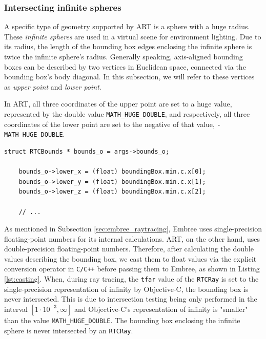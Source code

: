 \subsubsection{Intersecting infinite spheres}

A specific type of geometry supported by ART is a sphere with a huge radius. These \emph{infinite spheres} are used in a virtual scene for environment lighting.
Due to its radius, the length of the bounding box edges enclosing the infinite sphere is twice the infinite sphere's radius. 
Generally speaking, axis-aligned bounding boxes can be described by two vertices in Euclidean space, connected via the bounding box's body diagonal. In this subsection, we will refer to these vertices as \emph{upper point} and \emph{lower point}. 

In ART, all three coordinates of the upper point are set to a huge value, represented by the double value \texttt{MATH\_HUGE\_DOUBLE}, and respectively, all three coordinates of the lower point are set to the negative of that value, \texttt{- MATH\_HUGE\_DOUBLE}.

\begin{listing} 
	\begin{lstlisting}[caption={Casting of a double precision floating point number to a single precision floating point number by explicit conversion.}, label={lst:casting}]
	struct RTCBounds * bounds_o = args->bounds_o;
	
	bounds_o->lower_x = (float) boundingBox.min.c.x[0];
	bounds_o->lower_y = (float) boundingBox.min.c.x[1];
	bounds_o->lower_z = (float) boundingBox.min.c.x[2];
	
	// ...
	\end{lstlisting}
\end{listing}

As mentioned in Subsection \ref{sec:embree_raytracing}, Embree uses single-precision floating-point numbers for its internal calculations. ART, on the other hand, uses double-precision floating-point numbers. Therefore, after calculating the double values describing the bounding box, we cast them to float values via the explicit conversion operator in \texttt{C/C++} before passing them to Embree, as shown in Listing \ref{lst:casting}.  
When, during ray tracing, the \texttt{tfar} value of the \texttt{RTCRay} is set to the single-precision representation of infinity by Objective-C, the bounding box is never intersected. This is due to intersection testing being only performed in the interval $[1\cdot 10^{-3},\infty]$ and Objective-C's representation of infinity is "smaller" than the value \texttt{MATH\_HUGE\_DOUBLE}. The bounding box enclosing the infinite sphere is never intersected by an \texttt{RTCRay}.

